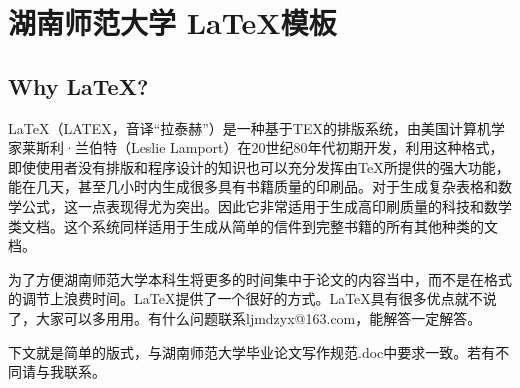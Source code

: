 \chapter{湖南师范大学 \LaTeX 模板}
\section{Why \LaTeX ? }
\LaTeX（LATEX，音译“拉泰赫”）是一种基于TEX的排版系统，由美国计算机学家莱斯利·兰伯特（Leslie Lamport）在20世纪80年代初期开发，利用这种格式，即使使用者没有排版和程序设计的知识也可以充分发挥由\TeX{}所提供的强大功能，能在几天，甚至几小时内生成很多具有书籍质量的印刷品。对于生成复杂表格和数学公式，这一点表现得尤为突出。因此它非常适用于生成高印刷质量的科技和数学类文档。这个系统同样适用于生成从简单的信件到完整书籍的所有其他种类的文档。

为了方便湖南师范大学本科生将更多的时间集中于论文的内容当中，而不是在格式的调节上浪费时间。\LaTeX 提供了一个很好的方式。\LaTeX 具有很多优点就不说了，大家可以多用用。有什么问题联系ljmdzyx@163.com，能解答一定解答。
\par 下文就是简单的版式，与湖南师范大学毕业论文写作规范.doc中要求一致。若有不同请与我联系。

